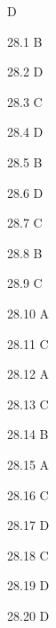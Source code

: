 \begin{Solution}{28}
D
\end{Solution}
\begin{Solution}{28.{1}}
B
\end{Solution}
\begin{Solution}{28.{2}}
D
\end{Solution}
\begin{Solution}{28.{3}}
C
\end{Solution}
\begin{Solution}{28.{4}}
D
\end{Solution}
\begin{Solution}{28.{5}}
B
\end{Solution}
\begin{Solution}{28.{6}}
D
\end{Solution}
\begin{Solution}{28.{7}}
C
\end{Solution}
\begin{Solution}{28.{8}}
B
\end{Solution}
\begin{Solution}{28.{9}}
C
\end{Solution}
\begin{Solution}{28.{10}}
A
\end{Solution}
\begin{Solution}{28.{11}}
C
\end{Solution}
\begin{Solution}{28.{12}}
A
\end{Solution}
\begin{Solution}{28.{13}}
C
\end{Solution}
\begin{Solution}{28.{14}}
B
\end{Solution}
\begin{Solution}{28.{15}}
A
\end{Solution}
\begin{Solution}{28.{16}}
C
\end{Solution}
\begin{Solution}{28.{17}}
D
\end{Solution}
\begin{Solution}{28.{18}}
C
\end{Solution}
\begin{Solution}{28.{19}}
D
\end{Solution}
\begin{Solution}{28.{20}}
D
\end{Solution}
